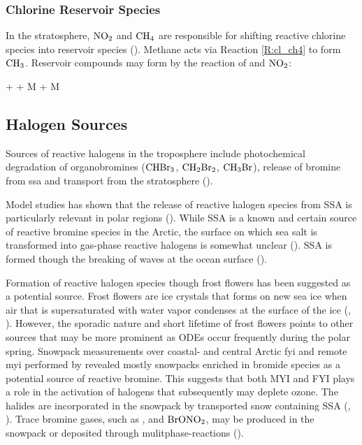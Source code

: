 \subsubsection{Chlorine Reservoir Species}

In the stratosphere, $\mathrm{NO_2}$ and $\mathrm{CH_4}$ are responsible for shifting reactive chlorine species into reservoir species (\cite{SeinfeldSpyros}). Methane acts via Reaction \ref{R:cl_ch4} to form $\mathrm{CH_3}$. Reservoir compounds may form by the reaction of  and $\mathrm{NO_2}$: 

\begin{reaction}
     +  + M \rightarrow {} + M
    \label{R:clono2}
\end{reaction}

\subsection{Halogen Sources}\label{sec:halogen_sources}

Sources of reactive halogens in the troposphere include photochemical degradation of organobromines ($\mathrm{CHBr_3}$, $\mathrm{CH_2Br_2}$, $\mathrm{CH_3Br}$), release of bromine from \acrfull{ssa} and transport from the stratosphere (\cite{Schmidt}). 

\medskip

Model studies has shown that the release of reactive halogen species from SSA is particularly relevant in polar regions (\cite{Schmidt}). While SSA is a known and certain source of reactive bromine species in the Arctic, the surface on which sea salt is transformed into gas-phase reactive halogens is somewhat unclear (\cite{Simpson2005}). SSA is formed though the breaking of waves at the ocean surface (\cite{Simpson2015}). 

\medskip

Formation of reactive halogen species though frost flowers has been suggested as a potential source. Frost flowers are ice crystals that forms on new sea ice when air that is supersaturated with water vapor condenses at the surface of the ice (\cite{GRANFORS2013124}, \cite{Kaleschke}). However, the sporadic nature and short lifetime of frost flowers points to other sources that may be more prominent as ODEs occur frequently during the polar spring. Snowpack measurements over coastal- and central Arctic \acrfull{fyi} and remote \acrfull{myi} performed by \cite{Peterson2019} revealed mostly snowpacks enriched in bromide species as a potential source of reactive bromine. This suggests that both MYI and FYI plays a role in the activation of halogens that subsequently may deplete ozone. The halides are incorporated in the snowpack by transported snow containing SSA (\cite{Toyota}, \cite{Peterson2019}). Trace bromine gases, such as ,  and $\mathrm{BrONO_2}$, may be produced in the snowpack or deposited through mulitphase-reactions (\cite{Simpson2005}). 


